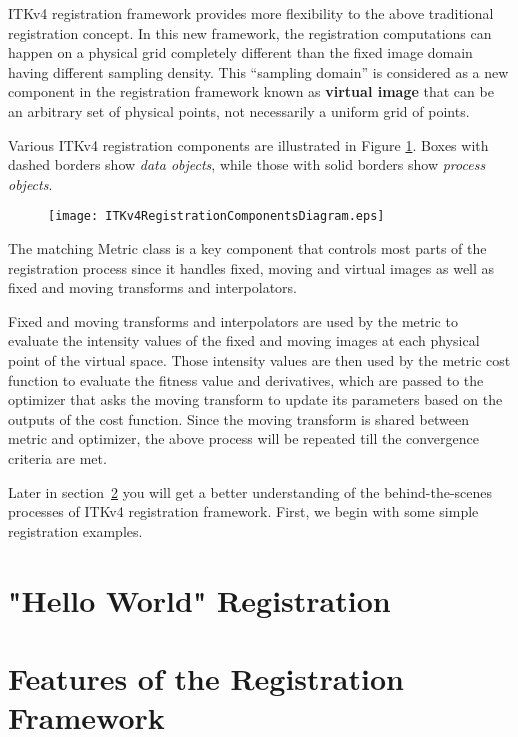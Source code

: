 ITKv4 registration framework provides more flexibility to the above traditional
registration concept. In this new framework, the registration computations can
happen on a physical grid completely different than the fixed image domain having
different sampling density.
This ``sampling domain'' is considered as a new component in the registration
framework known as \textbf{virtual image} that can be an arbitrary set of physical
points, not necessarily a uniform grid of points.

Various ITKv4 registration components are illustrated in Figure
\ref{fig:ITKv4RegistrationComponents}. Boxes with dashed borders show
\emph{data objects}, while those with solid borders show \emph{process objects}.

\begin{figure}
\centering
\texttt{[image: ITKv4RegistrationComponentsDiagram.eps]}
\label{fig:ITKv4RegistrationComponents}
\end{figure}

The matching Metric class is a key component that controls most parts of the
registration process since it handles fixed, moving and virtual images as well
as fixed and moving transforms and interpolators.

Fixed and moving transforms and interpolators are used by the metric to evaluate
the intensity values of the fixed and moving images at each physical point of the
virtual space. Those intensity values are then used by the metric cost function to
evaluate the fitness value and derivatives, which are passed to the optimizer that
asks the moving transform to update its parameters based on the outputs of the cost
function. Since the moving transform is shared between metric and optimizer,
the above process will be repeated till the convergence criteria are met.

Later in section~\ref{sec:FeaturesOfTheRegistrationFramework} you will get a
better understanding of the behind-the-scenes processes of ITKv4 registration
framework. First, we begin with some simple registration examples.


\section{"Hello World" Registration}
\label{sec:IntroductionImageRegistration}


\section{Features of the Registration Framework}
\label{sec:FeaturesOfTheRegistrationFramework}

